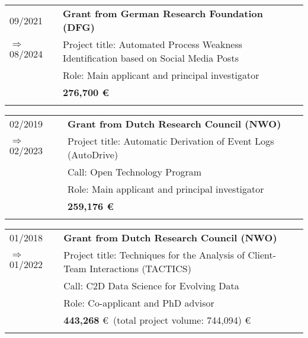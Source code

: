 \raggedright
\begin{tabular}{P{3cm}P{12cm}}

09/2021  														& \textbf{Grant from German Research Foundation (DFG)} \\
\hspace*{0.4cm} $\Rightarrow$ 08/2024 		& Project title: Automated Process Weakness Identification based on Social Media Posts \\
																		& Role: Main applicant and principal investigator \\\noalign{\smallskip}
																		& \textbf{276,700 \euro} \\
																		& \\
																																				\end{tabular}			
\begin{tabular}{P{3cm}P{12cm}}

02/2019  														& \textbf{Grant from Dutch Research Council (NWO)} \\
\hspace*{0.4cm} $\Rightarrow$ 02/2023 		& Project title: Automatic Derivation of Event Logs (AutoDrive) \\
																		& Call: Open Technology Program \\
																		& Role: Main applicant and principal investigator \\\noalign{\smallskip}
																		& \textbf{259,176 \euro} \\
																		& \\
																																				\end{tabular}														
\begin{tabular}{P{3cm}P{12cm}}
01/2018															& \textbf{Grant from Dutch Research Council (NWO)} \\
\hspace*{0.4cm} $\Rightarrow$ 01/2022 		& Project title: Techniques for the Analysis of Client-Team Interactions (TACTICS) \\
																		& Call: C2D Data Science for Evolving Data \\
																		& Role: Co-applicant and PhD advisor \\\noalign{\smallskip}
																		& \textbf{443,268} \euro \ (total project volume: 744,094) \euro \\
																		& \\
																		\end{tabular}														
